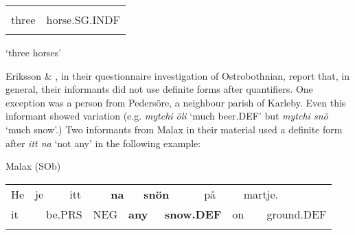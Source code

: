 \begin{tabular}{ll}
\lsptoprule
\multicolumn{2}{l}{tri

}\\
three & horse.SG.INDF\\
\lspbottomrule
\end{tabular}

\begin{styleTranslation}
‘three horses’

\end{styleTranslation}

\begin{styleBodyTextFirst}
Eriksson \& \citet[26]{Rendahl1999}, in their questionnaire investigation of Ostrobothnian, report that, in general, their informants did not use definite forms after quantifiers. One exception was a person from Pedersöre, a neighbour parish of Karleby. Even this informant showed variation (e.g. \textit{mytchi öli} ‘much beer.DEF’ but \textit{mytchi snö} ‘much snow’.) Two informants from Malax in their material used a definite form after \textit{itt na} ‘not any’ in the following example:

\end{styleBodyTextFirst}

\begin{listWWNumileveli}
\item {}

\begin{styleExample}
Malax (SOb)

\end{styleExample}

\end{listWWNumileveli}

\begin{tabular}{llllllllllllll}
\lsptoprule
He & \multicolumn{2}{l}{je

} & \multicolumn{2}{l}{itt

} & \multicolumn{2}{l}{{\bfseries na}

} & \multicolumn{2}{l}{{\bfseries snön}

} & \multicolumn{2}{l}{på

} & \multicolumn{2}{l}{martje.

} & \\
\multicolumn{2}{l}{it

} & \multicolumn{2}{l}{be.PRS

} & \multicolumn{2}{l}{NEG

} & \multicolumn{2}{l}{{\bfseries any}

} & \multicolumn{2}{l}{{\bfseries snow.DEF}

} & \multicolumn{2}{l}{on

} & \multicolumn{2}{l}{ground.DEF

}\\
\lspbottomrule
\end{tabular}

